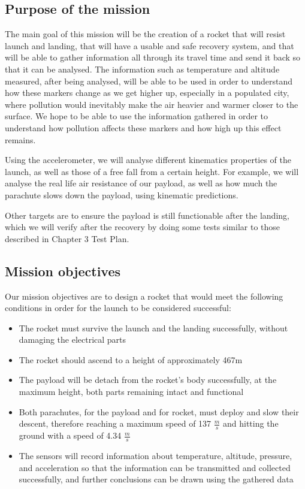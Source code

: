 \subsection{Purpose of the mission}

The main goal of this mission will be the creation of a rocket that will resist launch and landing, that will have a usable and safe recovery system, and that will be able to gather information all through its travel time and send it back so that it can be analysed. The information such as temperature and altitude measured, after being analysed, will be able to be used in order to understand how these markers change as we get higher up, especially in a populated city, where pollution would inevitably make the air heavier and warmer closer to the surface. We hope to be able to use the information gathered in order to understand how pollution affects these markers and how high up this effect remains.

Using the accelerometer, we will analyse different kinematics properties of the launch, as well as those of a free fall from a certain height. For example, we will analyse the real life air resistance of our payload, as well as how much the parachute slows down the payload, using kinematic predictions.

Other targets are to ensure the payload is still functionable after the landing, which we will verify after the recovery by doing some tests similar to those described in Chapter 3 Test Plan.

\subsection{Mission objectives}

Our mission objectives are to design a rocket that would meet the following conditions in order for the launch to be considered successful:

\begin{itemize}
  \item The rocket must survive the launch and the landing successfully, without damaging the electrical parts
  \item The rocket should ascend to a height of approximately 467m 
  \item The payload will be detach from the rocket’s body successfully, at the maximum height, both parts remaining intact and functional
  \item Both parachutes, for the payload and for rocket, must deploy and slow their descent, therefore reaching a maximum speed of 137 $ \frac{m}{s} $ and hitting the ground with a speed of 4.34 $ \frac{m}{s} $
  \item The sensors will record information about temperature, altitude, pressure, and acceleration so that the information can be transmitted and collected successfully, and further conclusions can be drawn using the gathered data
\end{itemize}

